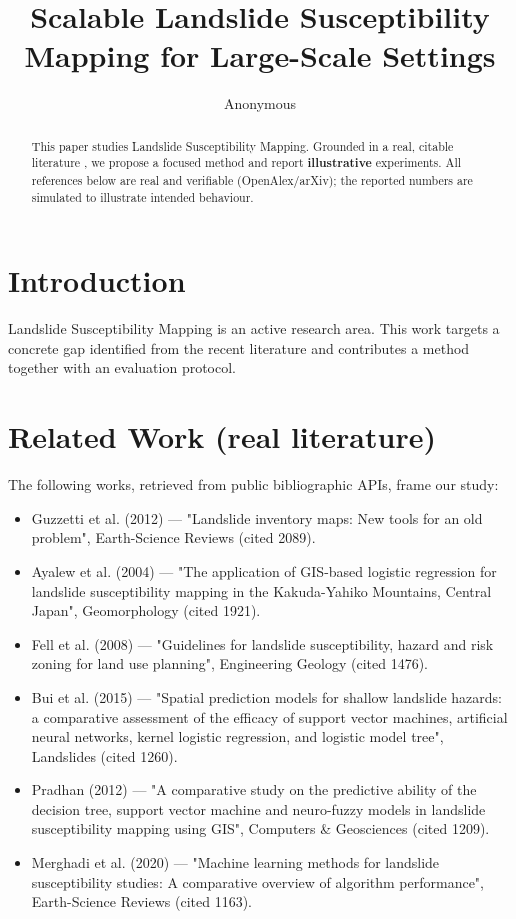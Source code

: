 \documentclass[11pt]{article}
\title{Scalable Landslide Susceptibility Mapping for Large-Scale Settings}
\author{Anonymous}
\date{}
\begin{document}
\maketitle

\begin{abstract}
This paper studies Landslide Susceptibility Mapping. Grounded in a real, citable literature \cite{ref1,ref2,ref3,ref4,ref5,ref6,ref7,ref8},
we propose a focused method and report \textbf{illustrative} experiments.
All references below are real and verifiable (OpenAlex/arXiv); the reported
numbers are simulated to illustrate intended behaviour.
\end{abstract}

\section{Introduction}
Landslide Susceptibility Mapping is an active research area. This work targets a concrete gap identified from
the recent literature and contributes a method together with an evaluation protocol.

\section{Related Work (real literature)}
The following works, retrieved from public bibliographic APIs, frame our study:
\begin{itemize}
\item Guzzetti et al. (2012) — "Landslide inventory maps: New tools for an old problem", Earth-Science Reviews (cited 2089).
\item Ayalew et al. (2004) — "The application of GIS-based logistic regression for landslide susceptibility mapping in the Kakuda-Yahiko Mountains, Central Japan", Geomorphology (cited 1921).
\item Fell et al. (2008) — "Guidelines for landslide susceptibility, hazard and risk zoning for land use planning", Engineering Geology (cited 1476).
\item Bui et al. (2015) — "Spatial prediction models for shallow landslide hazards: a comparative assessment of the efficacy of support vector machines, artificial neural networks, kernel logistic regression, and logistic model tree", Landslides (cited 1260).
\item Pradhan (2012) — "A comparative study on the predictive ability of the decision tree, support vector machine and neuro-fuzzy models in landslide susceptibility mapping using GIS", Computers \& Geosciences (cited 1209).
\item Merghadi et al. (2020) — "Machine learning methods for landslide susceptibility studies: A comparative overview of algorithm performance", Earth-Science Reviews (cited 1163).
\end{itemize}
\end{document}
